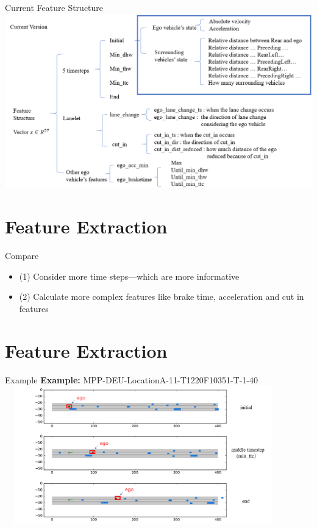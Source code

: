 \documentclass[shortpres]{beamer}
\begin{document}
\begin{frame}{Current Feature Structure}
\includegraphics[height=0.6\textheight]{fig_FeatureExtraction/CurrentVersion.png}
\end{frame}



\section{Feature Extraction}
\begin{frame}{Compare}
\begin{itemize} 
	\item (1) Consider more time steps—which are more informative
	\vfill \item (2) Calculate more complex features like brake time, acceleration and cut in features
\end{itemize}
\end{frame}

\section{Feature Extraction}
\begin{frame}{Example}
	\textbf{Example:} MPP-DEU-LocationA-11-T1220F10351-T-1-40
    \includegraphics[width=12cm,height=6cm]{fig_FeatureExtraction/example.png}
\end{frame}
\end{document}
